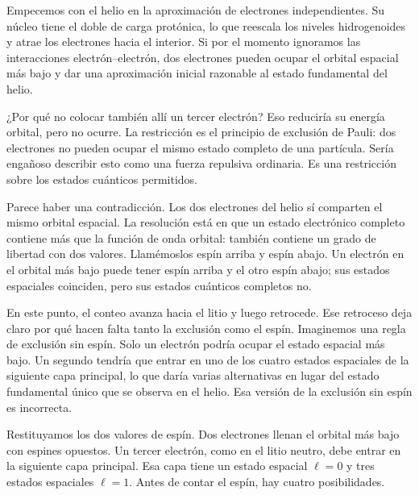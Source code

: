 Empecemos con el helio en la aproximación de electrones independientes. Su núcleo tiene el doble de carga protónica, lo que reescala los niveles hidrogenoides y atrae los electrones hacia el interior. Si por el momento ignoramos las interacciones electrón--electrón, dos electrones pueden ocupar el orbital espacial más bajo y dar una aproximación inicial razonable al estado fundamental del helio.

¿Por qué no colocar también allí un tercer electrón? Eso reduciría su energía orbital, pero no ocurre. La restricción es el principio de exclusión de Pauli: dos electrones no pueden ocupar el mismo estado completo de una partícula. Sería engañoso describir esto como una fuerza repulsiva ordinaria. Es una restricción sobre los estados cuánticos permitidos.

Parece haber una contradicción. Los dos electrones del helio sí comparten el mismo orbital espacial. La resolución está en que un estado electrónico completo contiene más que la función de onda orbital: también contiene un grado de libertad con dos valores. Llamémoslos espín arriba y espín abajo. Un electrón en el orbital más bajo puede tener espín arriba y el otro espín abajo; sus estados espaciales coinciden, pero sus estados cuánticos completos no.

En este punto, el conteo avanza hacia el litio y luego retrocede. Ese retroceso deja claro por qué hacen falta tanto la exclusión como el espín. Imaginemos una regla de exclusión sin espín. Solo un electrón podría ocupar el estado espacial más bajo. Un segundo tendría que entrar en uno de los cuatro estados espaciales de la siguiente capa principal, lo que daría varias alternativas en lugar del estado fundamental único que se observa en el helio. Esa versión de la exclusión sin espín es incorrecta.

Restituyamos los dos valores de espín. Dos electrones llenan el orbital más bajo con espines opuestos. Un tercer electrón, como en el litio neutro, debe entrar en la siguiente capa principal. Esa capa tiene un estado espacial \(\ell=0\) y tres estados espaciales \(\ell=1\). Antes de contar el espín, hay cuatro posibilidades.

\begin{classroomqa}
\end{classroomqa}

